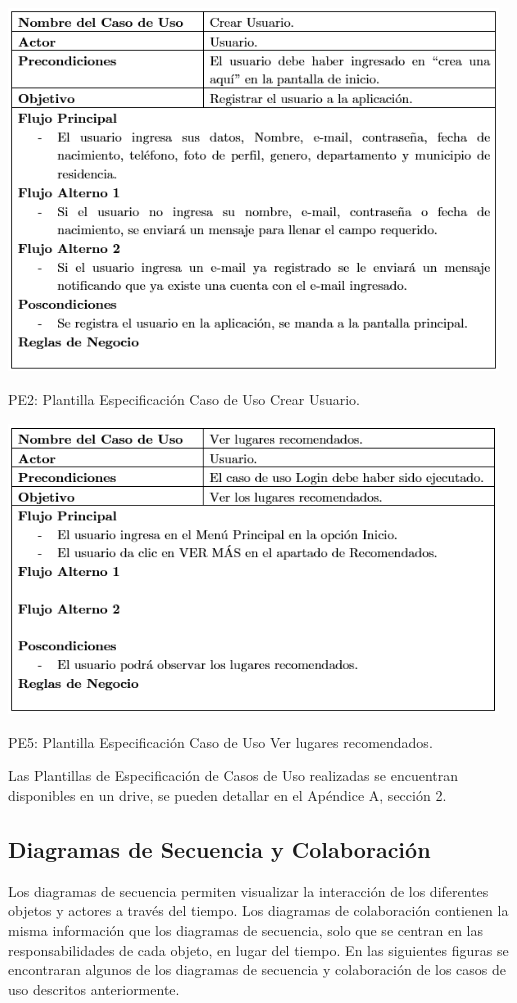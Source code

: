 \documentclass[12pt,letterpaper,openany]{book}
\begin{document}
\begin{table}[H]
\centering
\includegraphics[width=13cm]{./imagenes/PCU/crear_usuario}
\caption{PE2: Plantilla Especificación Caso de Uso Crear Usuario.}
\end{table}

\begin{table}[H]
\centering
\includegraphics[width=13cm]{./imagenes/PCU/ver_lugares_recomendados}
\caption{PE5: Plantilla Especificación Caso de Uso Ver lugares recomendados.}
\end{table}

Las Plantillas de Especificación de Casos de Uso realizadas se encuentran disponibles en un drive, se pueden detallar en el Apéndice A, sección 2.

\subsection{Diagramas de Secuencia y Colaboración}
Los diagramas de secuencia permiten visualizar la interacción de los diferentes objetos y actores a través del tiempo. Los diagramas de colaboración contienen la misma información que los diagramas de secuencia, solo que se centran en las responsabilidades de cada objeto, en lugar del tiempo. En las siguientes figuras se encontraran algunos de los diagramas de secuencia y colaboración de los casos de uso descritos anteriormente.
\end{document}
